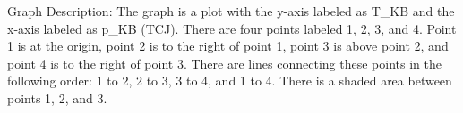 Graph Description: The graph is a plot with the y-axis labeled as T_KB and the x-axis labeled as p_KB (TCJ). There are four points labeled 1, 2, 3, and 4. Point 1 is at the origin, point 2 is to the right of point 1, point 3 is above point 2, and point 4 is to the right of point 3. There are lines connecting these points in the following order: 1 to 2, 2 to 3, 3 to 4, and 1 to 4. There is a shaded area between points 1, 2, and 3.